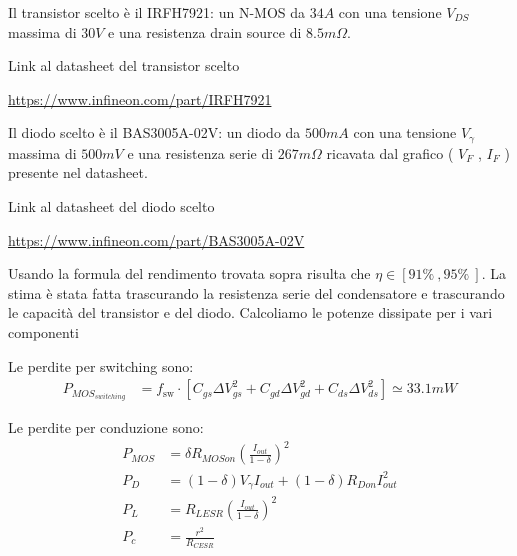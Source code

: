 \documentclass{article}
\begin{document}
\noindent
Il transistor scelto è il IRFH7921: un N-MOS da \(34 A\) con una tensione \(V_{DS}\) massima di \(30 V\) e una resistenza drain source di \(8.5 m \Omega \).

\vspace{0.5em}
\noindent
Link al datasheet del transistor scelto 
\begin{center}
    \url{https://www.infineon.com/part/IRFH7921}
\end{center}
\vspace{0.5em}

\noindent
Il diodo scelto è il BAS3005A-02V: un diodo da \(500 mA\) con una tensione \(V_{\gamma}\) massima di \(500 m V\) e una resistenza serie di \(267 m \Omega \) ricavata dal grafico ( \(V_F\) , \(I_F\) ) presente nel datasheet.

\vspace{0.5em}
\noindent
Link al datasheet del diodo scelto 
\begin{center}
    \url{https://www.infineon.com/part/BAS3005A-02V}
\end{center}
\vspace{0.5em}

\noindent
Usando la formula del rendimento trovata sopra risulta che \( \eta \in [91 \%\ , 95 \%\ ] \).
La stima è stata fatta trascurando la resistenza serie del condensatore e trascurando le capacità del transistor e del diodo.
Calcoliamo le potenze dissipate per i vari componenti

\vspace{0.5em}
\noindent
Le perdite per switching sono:
\vspace{0.5em}
\begin{align*}
    P_{{MOS}_{switching}} &= f_{\mathrm{sw}} \cdot \left[ C_{gs} \Delta V_{gs}^2 + C_{gd} \Delta V_{gd}^2 + C_{ds} \Delta V_{ds}^2 \right] \simeq 33.1 mW
\end{align*}
\vspace{0.5em}

\noindent
Le perdite per conduzione sono:
\vspace{0.5em}
\begin{align*}
    P_{MOS} &= \delta R_{MOSon} \left(\frac{I_{out}}{1-\delta} \right)^2\\
    P_D &= (1-\delta) V_\gamma I_{out} + (1-\delta)R_{Don}I_{out}^2\\
    P_L &= R_{LESR} \left(\frac{I_{out}}{1-\delta} \right)^2 \\
    P_c &= \frac{r^2}{R_{CESR}}
\end{align*}
\vspace{0.5em}
\end{document}
